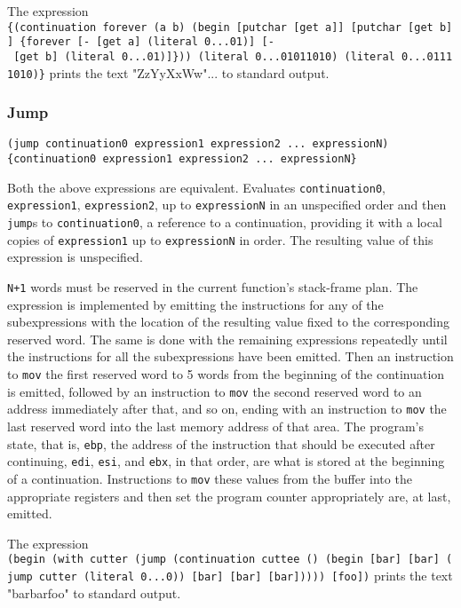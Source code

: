 \documentclass[]{article}
\begin{document}
The expression
\texttt{\{(continuation\ forever\ (a\ b)\ (begin\ {[}putchar\ {[}get\ a{]}{]}\ {[}putchar\ {[}get\ b{]}{]}\ \{forever\ {[}-\ {[}get\ a{]}\ (literal\ 0...01){]}\ {[}-\ {[}get\ b{]}\ (literal\ 0...01){]}\}))\ (literal\ 0...01011010)\ (literal\ 0...01111010)\}}
prints the text "ZzYyXxWw"... to standard output.

\hypertarget{jump}{%
\subsubsection{Jump}\label{jump}}

\begin{verbatim}
(jump continuation0 expression1 expression2 ... expressionN)
{continuation0 expression1 expression2 ... expressionN}
\end{verbatim}

Both the above expressions are equivalent. Evaluates
\texttt{continuation0}, \texttt{expression1}, \texttt{expression2}, up
to \texttt{expressionN} in an unspecified order and then \texttt{jump}s
to \texttt{continuation0}, a reference to a continuation, providing it
with a local copies of \texttt{expression1} up to \texttt{expressionN}
in order. The resulting value of this expression is unspecified.

\texttt{N+1} words must be reserved in the current function's
stack-frame plan. The expression is implemented by emitting the
instructions for any of the subexpressions with the location of the
resulting value fixed to the corresponding reserved word. The same is
done with the remaining expressions repeatedly until the instructions
for all the subexpressions have been emitted. Then an instruction to
\texttt{mov} the first reserved word to 5 words from the beginning of
the continuation is emitted, followed by an instruction to \texttt{mov}
the second reserved word to an address immediately after that, and so
on, ending with an instruction to \texttt{mov} the last reserved word
into the last memory address of that area. The program's state, that is,
\texttt{ebp}, the address of the instruction that should be executed
after continuing, \texttt{edi}, \texttt{esi}, and \texttt{ebx}, in that
order, are what is stored at the beginning of a continuation.
Instructions to \texttt{mov} these values from the buffer into the
appropriate registers and then set the program counter appropriately
are, at last, emitted.

The expression
\texttt{(begin\ (with\ cutter\ (jump\ (continuation\ cuttee\ ()\ (begin\ {[}bar{]}\ {[}bar{]}\ (jump\ cutter\ (literal\ 0...0))\ {[}bar{]}\ {[}bar{]}\ {[}bar{]}))))\ {[}foo{]})}
prints the text "barbarfoo" to standard output.
\end{document}
